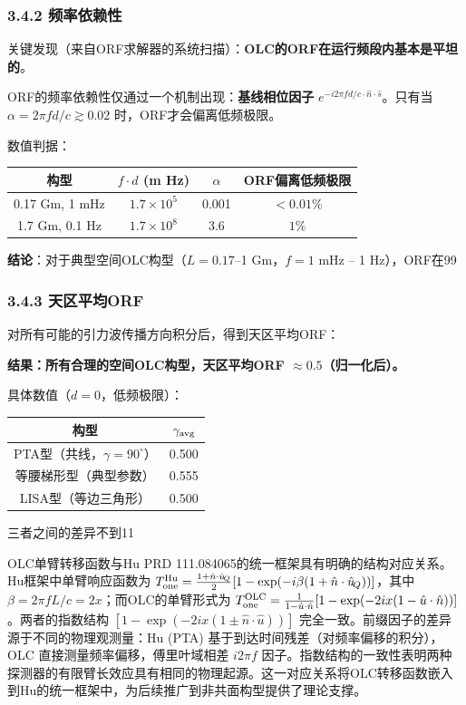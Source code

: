 \documentclass[12pt,a4paper]{article}
\begin{document}
\subsubsection{3.4.2 频率依赖性}


关键发现（来自ORF求解器的系统扫描）：\textbf{OLC的ORF在运行频段内基本是平坦的}。

ORF的频率依赖性仅通过一个机制出现：\textbf{基线相位因子} $e^{-i2\pi fd/c \cdot \hat{n}\cdot\hat{s}}$。只有当 $\alpha = 2\pi fd/c \gtrsim 0.02$ 时，ORF才会偏离低频极限。

数值判据：

\begin{tabular}{|c|c|c|c|}
\hline
构型 & $f \cdot d$ (m Hz) & $\alpha$ & ORF偏离低频极限 \\
\hline
0.17 Gm, 1 mHz & $1.7 \times 10^5$ & 0.001 & $<0.01\%$ \\
1.7 Gm, 0.1 Hz & $1.7 \times 10^8$ & 3.6 & $1\%$ \\
\hline
\end{tabular}


\textbf{结论}：对于典型空间OLC构型（$L = 0.17$–1 Gm，$f = 1$ mHz – 1 Hz），ORF在99%

\subsubsection{3.4.3 天区平均ORF}


对所有可能的引力波传播方向积分后，得到天区平均ORF：

\textbf{结果：所有合理的空间OLC构型，天区平均ORF $\approx 0.5$（归一化后）。}

具体数值（$d = 0$，低频极限）：

\begin{tabular}{|c|c|}
\hline
构型 & $\gamma_{\rm avg}$ \\
\hline
PTA型（共线，$\gamma = 90^\circ$） & 0.500 \\
等腰梯形型（典型参数） & 0.555 \\
LISA型（等边三角形） & 0.500 \\
\hline
\end{tabular}


三者之间的差异不到11%

OLC单臂转移函数与Hu PRD 111.084065的统一框架具有明确的结构对应关系。Hu框架中单臂响应函数为 $T_{\rm one}^{\rm Hu} = \frac{1+\hat{n}\cdot\hat{u}_{\!Q}}{2} [1 - \exp(-i\beta(1+\hat{n}\cdot\hat{u}_{\!Q}))]$，其中 $\beta = 2\pi f L/c = 2x$；而OLC的单臂形式为 $T_{\rm one}^{\rm OLC} = \frac{1}{1-\hat{u}\cdot\hat{n}} [1 - \exp(-2ix(1-\hat{u}\cdot\hat{n}))]$。两者的指数结构 $[1 - \exp(-2ix(1\pm\hat{n}\cdot\hat{u}))]$ 完全一致。前缀因子的差异源于不同的物理观测量：Hu (PTA) 基于到达时间残差（对频率偏移的积分），OLC 直接测量频率偏移，傅里叶域相差 $i2\pi f$ 因子。指数结构的一致性表明两种探测器的有限臂长效应具有相同的物理起源。这一对应关系将OLC转移函数嵌入到Hu的统一框架中，为后续推广到非共面构型提供了理论支撑。
\end{document}
